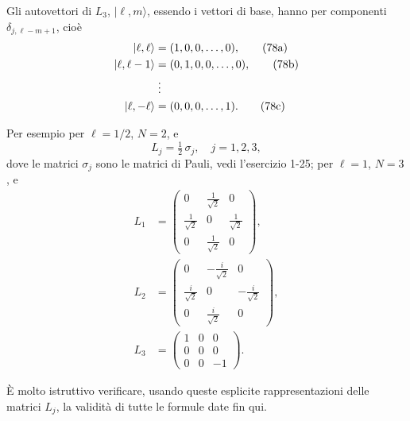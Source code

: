 \documentclass[11pt, a4paper]{book}
\numberwithin{equation}{section}
\begin{document}
Gli autovettori di $L_3$, $|\ell,m\rangle$, essendo i vettori di base,
hanno per componenti $\delta_{j,\ell-m+1}$, cioè
\begin{align}
|\ell,\ell\rangle   &= (1,0,0,\ldots,0), \tag{78a} \\
|\ell,\ell-1\rangle &= (0,1,0,0,\ldots,0), \tag{78b} \\
                    &\;\vdots \notag \\
|\ell,-\ell\rangle  &= (0,0,0,\ldots,1). \tag{78c}
\end{align}


Per esempio per $\ell=1/2$, $N=2$, e
\begin{equation}
L_j = \tfrac{1}{2}\,\sigma_j, \quad j=1,2,3,
\end{equation}
dove le matrici $\sigma_j$ sono le matrici di Pauli, vedi l'esercizio
1-25; per $\ell=1$, $N=3$, e
\begin{align}
L_1 &=
\begin{pmatrix}
0          & \frac{1}{\sqrt{2}} & 0 \\
\frac{1}{\sqrt{2}} & 0          & \frac{1}{\sqrt{2}} \\
0          & \frac{1}{\sqrt{2}} & 0
\end{pmatrix}, \tag{80a} \\[6pt]
L_2 &=
\begin{pmatrix}
0           & -\frac{i}{\sqrt{2}} & 0 \\
\frac{i}{\sqrt{2}} & 0            & -\frac{i}{\sqrt{2}} \\
0           & \frac{i}{\sqrt{2}}  & 0
\end{pmatrix}, \tag{80b} \\[6pt]
L_3 &=
\begin{pmatrix}
1 & 0 &  0 \\
0 & 0 &  0 \\
0 & 0 & -1
\end{pmatrix}. \tag{80c}
\end{align}

È molto istruttivo verificare, usando queste esplicite rappresentazioni
delle matrici $L_j$, la validità di tutte le formule date fin qui.
\end{document}
